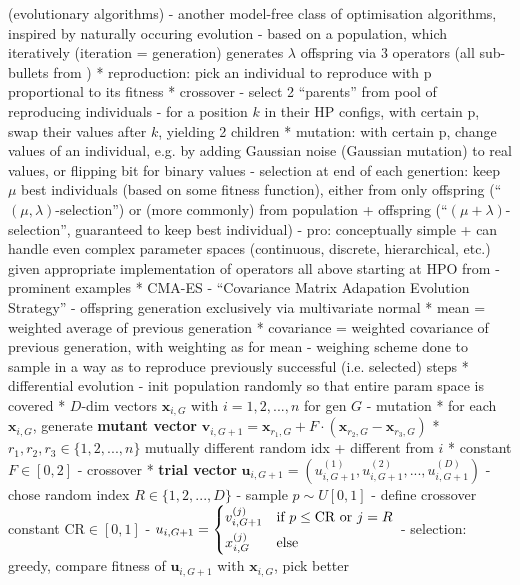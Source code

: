 \documentclass[twoside,11pt]{article}
\begin{document}
(evolutionary algorithms)
- another model-free class of optimisation algorithms, inspired by naturally occuring evolution
- based on a population, which iteratively (iteration = generation) generates $\lambda$ offspring via 3 operators (all sub-bullets from \citet[pp. 10-]{genetic_algos})
  * reproduction: pick an individual to reproduce with p proportional to its fitness
  * crossover
    - select 2 ``parents'' from pool of reproducing individuals
    - for a position $k$ in their HP configs, with certain p, swap their values after $k$, yielding 2 children
  * mutation: with certain p, change values of an individual, e.g. by adding Gaussian noise (Gaussian mutation) to real values, or flipping bit for binary values
- selection at end of each genertion: keep $\mu$ best individuals (based on some fitness function), either from only offspring (``$(\mu,\lambda)$-selection'')
  or (more commonly) from population + offspring (``$(\mu+\lambda)$-selection'', guaranteed to keep best individual)
- pro: conceptually simple + can handle even complex parameter spaces (continuous, discrete, hierarchical, etc.) given appropriate implementation of operators
all above starting at HPO from \citep[chap. 1.3]{feurer_hyperparameter_2019}
- prominent examples
  * CMA-ES
    - ``Covariance Matrix Adapation Evolution Strategy''
    - offspring generation exclusively via multivariate normal \citep[p. 8]{hansen2023cmaevolutionstrategytutorial}
      * mean = weighted average of previous generation
      * covariance = weighted covariance of previous generation, with weighting as for mean
    - weighing scheme done to sample in a way as to reproduce previously successful (i.e. selected) steps \citep[p. 11]{hansen2023cmaevolutionstrategytutorial}
  * differential evolution \citep[-]{differential_evolution}
    - init population randomly so that entire param space is covered
      * $D$-dim vectors $\boldsymbol{x}_{i,G}$ with $i=1,2,...,n$ for gen $G$
    - mutation
      * for each $\boldsymbol{x}_{i,G}$, generate \textbf{mutant vector} $\boldsymbol{v}_{i,G+1}=\boldsymbol{x}_{r_1,G}+F\cdot(\boldsymbol{x}_{r_2,G}-\boldsymbol{x}_{r_3,G})$
      * $r_1,r_2,r_3\in\{1,2,...,n\}$ mutually different random idx + different from $i$
      * constant $F\in[0,2]$
    - crossover
      * \textbf{trial vector} $\boldsymbol{u}_{i,G+1}=(u_{i,G+1}^{(1)},u_{i,G+1}^{(2)},...,u_{i,G+1}^{(D)})$
        - chose random index $R\in\{1,2,...,D\}$
        - sample $p\sim U[0,1]$
        - define crossover constant $\text{CR}\in[0,1]$
        - $u_{i,G+1} = \begin{dcases}
          v_{i,G+1}^{(j)} & \text{if } p\le\text{CR}\text{ or } j=R \\
          x_{i,G}^{(j)} & \text{else}
         \end{dcases}$
    - selection: greedy, compare fitness of $\boldsymbol{u}_{i,G+1}$ with $\boldsymbol{x}_{i,G}$, pick better
\end{document}
